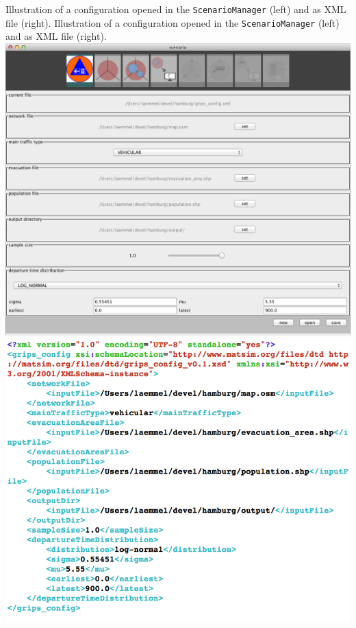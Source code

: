 \createfigure%
{Illustration of a configuration opened in the \lstinline|ScenarioManager| (left) and as XML file (right).}%
{Illustration of a configuration opened in the \lstinline|ScenarioManager| (left) and as XML file (right).}%
{\label{chap:evac:fig:sc_man}}%
{%
  \createsubfigure%
  {}%
{\includegraphics[width=.475\linewidth]{extending/figures/Evacuation/grips_config}}
  {}%
  {}%
  \createsubfigure%
  {}%
{\includegraphics[width=.475\linewidth]{extending/figures/Evacuation/grips_config_xml}}
  {}%
  {}%
}%
  {}%

